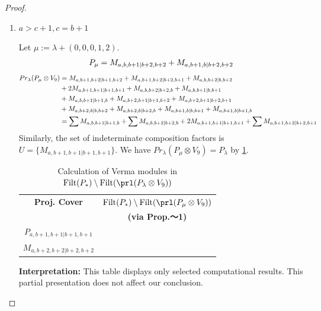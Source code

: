 \begin{proof}
\begin{enumerate}
\begin{enumerate}
      \item $a>c+1,c=b+1$\par
        Let $\mu:=\lambda + (0,0,0,1,2) $.
        \begin{equation}\notag
          \begin{aligned}
            P_\mu = M_{a,b,b+1|b+2,b+2}
+ M_{a,b+1,b|b+2,b+2}
          \end{aligned}
        \end{equation}
        \begin{equation}\notag
          \begin{aligned}
            Pr_{\lambda}(P_\mu \otimes V_{9}) &=
M_{a,b+1,b+2|b+1,b+2}
+ M_{a,b+1,b+2|b+2,b+1}
+ M_{a,b,b+2|b,b+2}\\
                                              &
+ 2M_{a,b+1,b+1|b+1,b+1}
+ M_{a,b,b+2|b+2,b}
+ M_{a,b,b+1|b,b+1}\\
                                              &
+ M_{a,b,b+1|b+1,b}
+ M_{a,b+2,b+1|b+1,b+2}
+ M_{a,b+2,b+1|b+2,b+1}\\
                                              &
+ M_{a,b+2,b|b,b+2}
+ M_{a,b+2,b|b+2,b}
+ M_{a,b+1,b|b,b+1}
+ M_{a,b+1,b|b+1,b} \\
                                               &=
\sum M_{a,b,b+1|b+1,b}
+ \sum M_{a,b,b+2|b+2,b}
+ 2 M_{a,b+1,b+1|b+1,b+1}
+ \sum M_{a,b+1,b+2|b+2,b+1}
          \end{aligned}
        \end{equation}
      Similarly, the set of indeterminate composition factors is $U = \{
M_{a,b+1,b+1|b+1,b+1}
\}$. We have $Pr_{\lambda}(P_\mu \otimes V_{9}) = P_\lambda  $ by \cref{tab:verma-analysis_b_9}.
\begin{table}[htbp]
\centering
\caption{Calculation of Verma modules in $\operatorname{Filt}(P_*) \setminus \operatorname{Filt}(\prl(P_\lambda \otimes V_{9})) $ } \label{tab:verma-analysis_b_9}
\begin{tabular}{cc}
\toprule
\textbf{Proj. Cover} & \textbf{$\operatorname{Filt}(P_*) \setminus \operatorname{Filt}(\prl(P_\mu \otimes V_{9})) $}  \\
     & \textbf{(via Prop.～1)}  \\
\midrule
 $P_{a,b+1,b+1|b+1,b+1}$ & \makecell{
 $M_{a,b+2,b+1|b+2,b+1}$,
 $M_{a,b+2,b+1|b+1,b+2}$,
 $M_{a,b+1,b+2|b+2,b+1}$,
 $M_{a,b+1,b+2|b+1,b+2}$, \\
 $M_{a,b+2,b+2|b+2,b+2}$
}\\
\bottomrule
\end{tabular}
\vspace{0.5em}
\parbox{\linewidth}{\small
\textbf{Interpretation:}
This table displays only selected computational results. This partial presentation does not affect our conclusion.
}
\end{table}


\end{enumerate}
\end{enumerate}
\end{proof}
